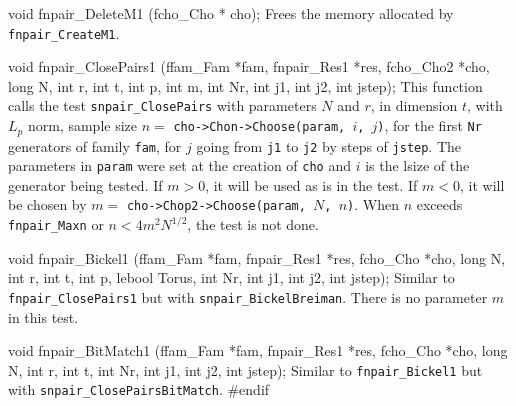 void fnpair_DeleteM1 (fcho_Cho * cho);
\endcode
 \tab 
  Frees the memory allocated by {\tt fnpair\_CreateM1}.
 \endtab




\code


void fnpair_ClosePairs1 (ffam_Fam *fam, fnpair_Res1 *res, fcho_Cho2 *cho,
                         long N, int r, int t, int p, int m,
                         int Nr, int j1, int j2, int jstep);
\endcode
\tab
 This function calls the test {\tt snpair\_ClosePairs}
 with parameters $N$ and $r$, in dimension $t$, with $L_p$ norm,
 sample size $n =$ {\tt cho->Chon->Choose(param, $i$, $j$)}, 
 for the first {\tt Nr} generators of family {\tt fam}, for $j$ going from
 {\tt j1} to {\tt j2} by steps of {\tt jstep}. The parameters in {\tt param}
 were set at the creation of {\tt cho} and $i$ is the lsize of the
 generator being tested. If $m > 0$, it will be used as is in the test.
 If  $m < 0$, it will be chosen by $m =$
  {\tt cho->Chop2->Choose(param, $N$, $n$)}.
 When $n$ exceeds {\tt fnpair\_Maxn} or $n < 4m^2 N^{1/2}$, the test
 is not done.
\endtab
\code


void fnpair_Bickel1 (ffam_Fam *fam, fnpair_Res1 *res, fcho_Cho *cho,
                     long N, int r, int t, int p, lebool Torus,
                     int Nr, int j1, int j2, int jstep);
\endcode
\tab
 Similar to {\tt fnpair\_ClosePairs1} but with {\tt snpair\_BickelBreiman}.
 There is no parameter $m$ in this test.
\endtab
\code


void fnpair_BitMatch1 (ffam_Fam *fam, fnpair_Res1 *res, fcho_Cho *cho,
                       long N, int r, int t,
                       int Nr, int j1, int j2, int jstep);
\endcode
\tab
 Similar to {\tt fnpair\_Bickel1} but with 
 {\tt snpair\_ClosePairsBitMatch}.
\endtab
\code
\hide
#endif
\endhide
\endcode

